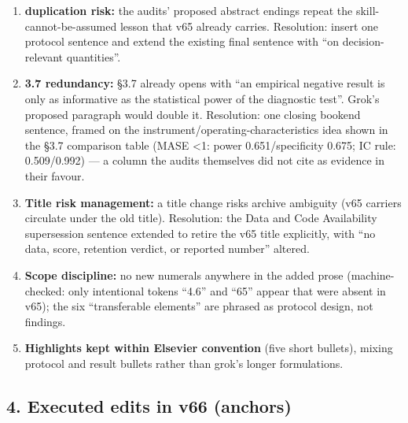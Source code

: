 \documentclass[11pt]{article}
\providecommand{\tightlist}{\setlength{\itemsep}{0.2em}\setlength{\parskip}{0pt}}
\begin{document}
\begin{enumerate}
\def\labelenumi{\arabic{enumi}.}
\tightlist
\item
  \textbf{duplication risk:} the audits' proposed abstract endings
  repeat the skill-cannot-be-assumed lesson that v65 already carries.
  Resolution: insert one protocol sentence and extend the existing final
  sentence with ``on decision-relevant quantities''.
\item
  \textbf{3.7 redundancy:} §3.7 already opens with ``an empirical
  negative result is only as informative as the statistical power of the
  diagnostic test''. Grok's proposed paragraph would double it.
  Resolution: one closing bookend sentence, framed on the
  instrument/operating-characteristics idea shown in the §3.7 comparison
  table (MASE \textless1: power 0.651/specificity 0.675; IC rule:
  0.509/0.992) --- a column the audits themselves did not cite as
  evidence in their favour.
\item
  \textbf{Title risk management:} a title change risks archive ambiguity
  (v65 carriers circulate under the old title). Resolution: the Data and
  Code Availability supersession sentence extended to retire the v65
  title explicitly, with ``no data, score, retention verdict, or
  reported number'' altered.
\item
  \textbf{Scope discipline:} no new numerals anywhere in the added prose
  (machine-checked: only intentional tokens ``4.6'' and ``65'' appear
  that were absent in v65); the six ``transferable elements'' are
  phrased as protocol design, not findings.
\item
  \textbf{Highlights kept within Elsevier convention} (five short
  bullets), mixing protocol and result bullets rather than grok's longer
  formulations.
\end{enumerate}

\subsection{4. Executed edits in v66
(anchors)}\label{executed-edits-in-v66-anchors}
\end{document}
